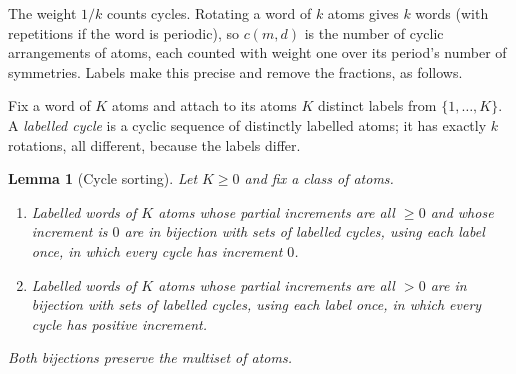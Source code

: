 \documentclass[11pt]{amsart}
\newtheorem{lemma}[theorem]{Lemma}
\theoremstyle{definition}
\theoremstyle{remark}
\begin{document}
The weight $1/k$ counts cycles. Rotating a word of $k$ atoms gives $k$ words (with repetitions if the word is periodic),
so $c(m,d)$ is the number of cyclic arrangements of atoms, each counted with weight one over its period's number of
symmetries. Labels make this precise and remove the fractions, as follows.

Fix a word of $K$ atoms and attach to its atoms $K$ distinct labels from $\{1,\dots,K\}$. A \emph{labelled cycle} is a
cyclic sequence of distinctly labelled atoms; it has exactly $k$ rotations, all different, because the labels differ.

\begin{lemma}[Cycle sorting]\label{lem:sort}
Let $K\ge0$ and fix a class of atoms.
\begin{enumerate}
\item[(i)] Labelled words of $K$ atoms whose partial increments are all $\ge0$ and whose increment is $0$ are in bijection
with sets of labelled cycles, using each label once, in which every cycle has increment $0$.
\item[(ii)] Labelled words of $K$ atoms whose partial increments are all $>0$ are in bijection with sets of labelled
cycles, using each label once, in which every cycle has positive increment.
\end{enumerate}
Both bijections preserve the multiset of atoms.
\end{lemma}
\end{document}
